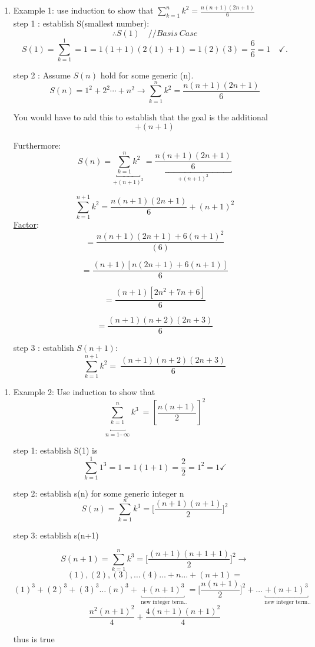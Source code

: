 \documentclass[10pt,letterpaper]{article}
\begin{document}
{
\begin{enumerate}
\item[]
    Example 1: use induction to show that $\sum \limits_{k = 1}^{n} k^{2} = \frac{n(n+1)(2n+1)}{6}$\\
    step 1 : establish S(smallest number): $$\therefore S(1) \quad //Basis \ Case$$
    $$S(1) = \sum \limits_{k=1}^{1} = 1 = 1(1+1)(2(1) +1) = 1(2)(3) = \frac{6}{6} = 1 \quad \checkmark.$$

    step 2 : Assume $S(n)$ hold for some generic (n).
    $$S(n) = 1^{2} + 2^{2} \cdots + n^{2} \rightarrow \sum^{n}_{k=1} k^{2} = \frac{n(n+1)(2n+1)}{6}$$
    \begin{center}
         You would have to add this to establish that the goal is the additional {$$+(n+1)$$}
    \end{center}
    Furthermore:
    $$ S(n)= \underbracket{\sum^{n}_{k=1} k^{2}}_{\boxed{+ (n+1)^{2}}} = \underbracket{\frac{n(n+1)(2n+1)}{6}}_{\boxed{+ (n+1)^{2}}}$$
    
    $$\sum^{n+1}_{k=1} k^{2} = \frac{n(n+1)(2n+1)}{6} + (n+1)^{2} $$
    \underline{Factor}: 
    $$ = \frac{n(n+1)(2n+1)+6(n+1)^{2}}{(6)} $$
    
    $$ = \frac{(n+1) \left[ n(2n+1) + 6(n+1) \right]}{6}$$
    
    $$ = \frac{ (n+1)\left[ 2n^{2} + 7n + 6 \right]}{6}$$
    
    $$ = \frac{ (n+1)(n+2)(2n+3) } {6} $$
    
    step 3 : establish $S(n+1)$: $$ \sum^{n+1}_{k=1} k^{2} = \ \frac{(n+1)(n+2)(2n+3)}{6}$$
\end{enumerate}

\newpage{}
\begin{enumerate}
    \item [] Example 2: Use induction to show that $$ \underbracket{ \sum \limits^{n}_{k=1}}_{n = 1\cdots \infty} k^{3} \ = \left [ \frac{n(n+1)}{2} \right] ^ {2}$$
    
    
    step 1: establish S(1) is $$ \sum \limits^{1}_{k=1} 1^{3} = 1 = 1(1+1) = \frac{2}{2} = {1}^{2} = 1 \checkmark$$
    
    step 2: establish s(n) for some generic integer n $$S(n) = \sum \limits^{n}_{k=1} k^{3} = \bigg[ \frac{(n+1)(n+1)}{2}  \bigg] ^{2}$$
    
    step 3: establish s(n+1)
    
    $$S(n+1) = \sum \limits^{n}_{k=1} k^{3} = \bigg[ \frac{(n+1)(n+1+1)}{2}  \bigg] ^{2} \rightarrow$$
    $$ (1),(2),(3), \ldots (4) \ldots + n \ldots + (n+1) =$$
    $$(1)^{3} + (2)^{3} + (3)^{3} \ldots (n)^{3} + \underbracket{+ (n+1)^{3}}_{\text{ new integer term..}} = \Bigg[ \frac{n(n+1)}{2} \Bigg]^{2} + \ldots \underbracket{+ (n+1)^{3}}_{\text{ new integer term..}}$$
    $$ \frac{n^{2}(n+1)^{2}}{4} + \frac{4(n+1)(n+1)^{2}}{4}$$
    
    thus is true \checkmark
\end{enumerate}{}

}
\end{document}
